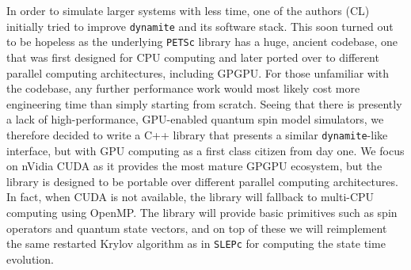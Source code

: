 \documentclass[preprint,12pt]{elsarticle}
\begin{document}
In order to simulate larger systems with less time, one of the authors (CL) initially tried
to improve {\tt dynamite} and its software stack. This soon turned out to be hopeless as
the underlying {\tt PETSc} library has a huge, ancient codebase, one that was first designed
for CPU computing and later ported over to different parallel computing architectures,
including GPGPU. For those unfamiliar with the codebase, any further performance work would
most likely cost more engineering time than simply
starting from scratch. Seeing that there is presently a lack of high-performance, GPU-enabled
quantum spin model simulators, we therefore decided to write a C++ library that presents a
similar {\tt dynamite}-like interface, but with GPU computing as a first class citizen from
day one. We focus on nVidia CUDA as it provides the most mature GPGPU ecosystem, but the
library is designed to be portable over different parallel computing architectures. In
fact, when CUDA is not available, the library will fallback to multi-CPU computing using
OpenMP. The library will provide basic primitives such as spin operators and quantum state
vectors, and on top of these we will reimplement the same restarted Krylov algorithm
\cite{eiermann2006} as in {\tt SLEPc} for computing the state time evolution.
\end{document}
